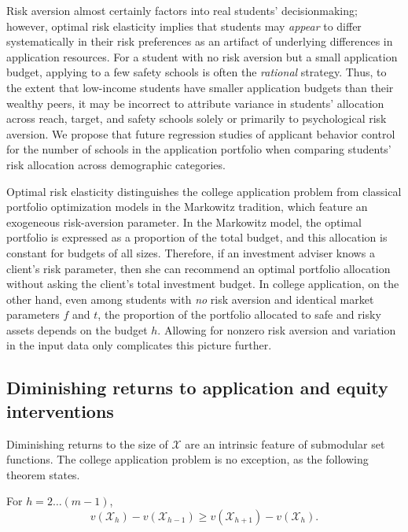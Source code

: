 Risk aversion almost certainly factors into real students' decisionmaking; however, optimal risk elasticity implies that students may \emph{appear} to differ systematically in their risk preferences as an artifact of underlying differences in application resources. For a student with no risk aversion but a small application budget, applying to a few safety schools is often the \emph{rational} strategy. Thus, to the extent that low-income students have smaller application budgets than their wealthy peers, it may be incorrect to attribute variance in students' allocation across reach, target, and safety schools solely or primarily to psychological risk aversion. We propose that future regression studies of applicant behavior control for the number of schools in the application portfolio when comparing students' risk allocation across demographic categories.

Optimal risk elasticity distinguishes the college application problem from classical portfolio optimization models in the Markowitz \cite{markowitz1952} tradition, which feature an exogeneous risk-aversion parameter. In the Markowitz model, the optimal portfolio is expressed as a proportion of the total budget, and this allocation is constant for budgets of all sizes. Therefore, if an investment adviser knows a client's risk parameter, then she can recommend an optimal portfolio allocation without asking the client's total investment budget. In college application, on the other hand, even among students with \emph{no} risk aversion and identical market parameters $f$ and $t$, the proportion of the portfolio allocated to safe and risky assets depends on the budget $h$. Allowing for nonzero risk aversion and variation in the input data only complicates this picture further.

\subsection{Diminishing returns to application and equity interventions}

Diminishing returns to the size of $\mathcal{X}$ are an intrinsic feature of submodular set functions. The college application problem is no exception, as the following theorem states.

\begin{theorem} \label{concavityinh}
For $h = 2 \dots (m-1)$,
\begin{equation*}
v(\mathcal{X}_h) - v(\mathcal{X}_{h-1}) \geq v(\mathcal{X}_{h+1}) - v(\mathcal{X}_{h}).
\end{equation*} 
\end{theorem}

